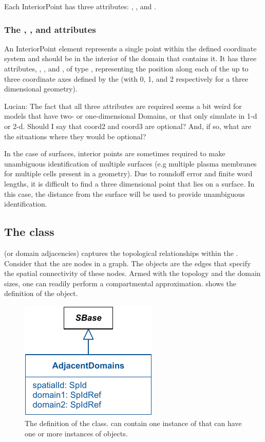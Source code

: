 Each InteriorPoint has three attributes: , , and . 

\subsubsection{The , , and  attributes}
An InteriorPoint element represents a single point within the defined coordinate system and should be in the interior of the domain that contains it. It has three attributes, , , and , of type , representing the position along each of the up to three coordinate axes defined by the \CoordinateComponents (with  0, 1, and 2 respectively for a three dimensional geometry). 

{\color{red} Lucian: \notice The fact that all three attributes are required seems a bit weird for models that have two- or one-dimensional Domains, or that only simulate in 1-d or 2-d.  Should I say that coord2 and coord3 are optional?  And, if so, what are the situations where they would be optional?}

In the case of surfaces, interior points are sometimes required to make unambiguous identification of multiple surfaces (e.g multiple plasma membranes for multiple cells present in a geometry).  Due to roundoff error and finite word lengths, it is difficult to find a three dimensional point that lies on a surface.  In this case, the distance from the surface will be used to provide unambiguous identification.


\subsection{The  class}
\label{AdjacentDomains-class}
\AdjacentDomains (or domain adjacencies) captures the topological relationships within the \Geometry.  Consider that the \Domains are nodes in a graph. The \AdjacentDomains objects are the edges that specify the spatial connectivity of these nodes.  Armed with the topology and the domain sizes, one can readily perform a compartmental approximation.   shows the definition of the \AdjacentDomains object.

\begin{figure}[ht]
  \includegraphics{figs/AdjacentDomains-uml}
  \caption{The definition of the \AdjacentDomains class. \Geometry can contain one instance of \ListOfAdjacentDomains that can have one or more instances of \AdjacentDomains objects.}
  \label{AdjacentDomains-uml}
\end{figure}

